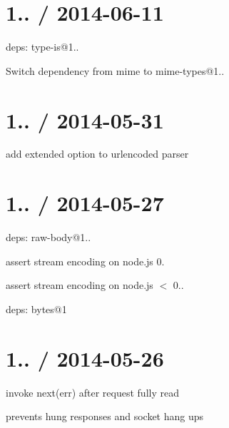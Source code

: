 \section*{1.. / 2014-\/06-\/11 }


\begin{DoxyItemize}
\item deps\+: type-\/is@1..
\begin{DoxyItemize}
\item Switch dependency from mime to mime-\/types@1..
\end{DoxyItemize}
\end{DoxyItemize}

\section*{1.. / 2014-\/05-\/31 }


\begin{DoxyItemize}
\item add {\ttfamily extended} option to urlencoded parser
\end{DoxyItemize}

\section*{1.. / 2014-\/05-\/27 }


\begin{DoxyItemize}
\item deps\+: raw-\/body@1..
\begin{DoxyItemize}
\item assert stream encoding on node.\+js 0.
\item assert stream encoding on node.\+js $<$ 0..
\item deps\+: bytes@1
\end{DoxyItemize}
\end{DoxyItemize}

\section*{1.. / 2014-\/05-\/26 }


\begin{DoxyItemize}
\item invoke {\ttfamily next(err)} after request fully read
\begin{DoxyItemize}
\item prevents hung responses and socket hang ups
\end{DoxyItemize}
\end{DoxyItemize}

